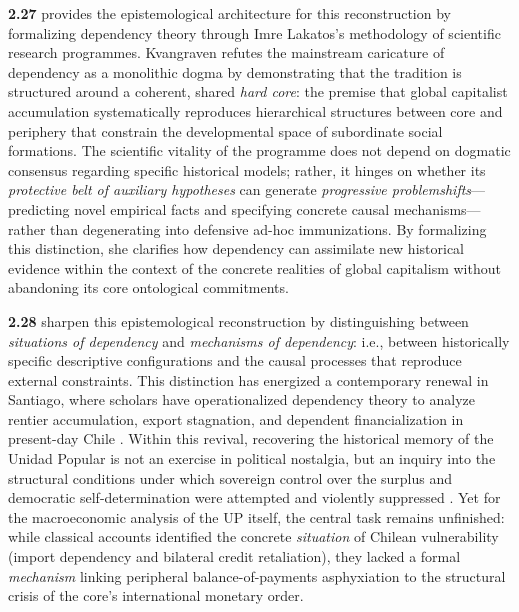 \textbf{2.27} \citet{Kvangraven2021} provides the epistemological architecture for this reconstruction 
by formalizing dependency theory through Imre Lakatos's methodology of scientific research programmes. 
Kvangraven refutes the mainstream caricature of dependency as a monolithic dogma by demonstrating that 
the tradition is structured around a coherent, shared \textit{hard core}: the premise that global capitalist 
accumulation systematically reproduces hierarchical structures between core and periphery that constrain 
the developmental space of subordinate social formations. The scientific vitality of the programme does not depend on dogmatic consensus regarding specific historical models; rather, it hinges on whether its \textit{protective belt of auxiliary hypotheses} can generate \textit{progressive problemshifts}---predicting novel empirical facts and specifying concrete causal mechanisms---rather than degenerating into defensive ad-hoc immunizations. By formalizing this distinction, she clarifies how dependency can assimilate new historical evidence within the context of the concrete realities of global capitalism without abandoning its core ontological commitments.

\textbf{2.28} \citet{MadariagaPalestini2021} sharpen this epistemological reconstruction by distinguishing 
between \textit{situations of dependency} and \textit{mechanisms of dependency}: i.e., between historically specific  descriptive configurations and the causal processes that reproduce external constraints. This 
distinction has energized a contemporary renewal in Santiago, where scholars have operationalized dependency 
theory to analyze rentier accumulation, export stagnation, and dependent financialization in present-day Chile 
\citep{Ahumada2019,Ruiz2021,AhumadaTorres2024,Sossdorf2024}. Within this revival, recovering the historical memory  of the Unidad Popular is not an exercise in political nostalgia, but an inquiry into the structural conditions 
under which sovereign control over the surplus and democratic self-determination were attempted and violently 
suppressed \citep{Arboleda2023,AhumadaChang2025}. Yet for the macroeconomic analysis of the UP itself, the 
central task remains unfinished: while classical accounts identified the concrete \textit{situation} of Chilean 
vulnerability (import dependency and bilateral credit retaliation), they lacked a formal \textit{mechanism} 
linking peripheral balance-of-payments asphyxiation to the structural crisis of the core's international monetary order.

